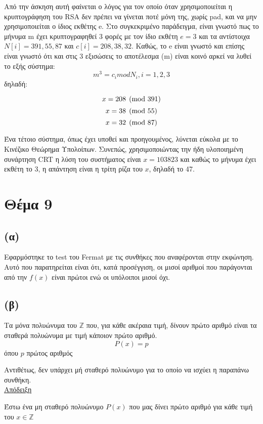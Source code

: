 \documentclass[a4paper, 11pt]{article}
\newcommand{\lt}{\latintext}
\begin{document}
Από την άσκηση αυτή φαίνεται ο λόγος για τον οποίο όταν χρησιμοποιείται η κρυπτογράφηση του {\lt RSA} δεν πρέπει να γίνεται ποτέ μόνη της, χωρίς {\lt pad}, και να μην χρησιμοποιείται ο ίδιος εκθέτης {\lt e}. Στο συγκεκριμένο παράδειγμα, είναι γνωστό πως το μήνυμα {\lt m} έχει κρυπτογραφηθεί 3 φορές με τον ίδιο εκθέτη $ e = 3 $ και τα αντίστοιχα $ N[i] = 391, 55, 87 $ και $ c[i] = 208, 38, 32 $. Καθώς, το {\lt e} είναι γνωστό και επίσης είναι γνωστό ότι και στις 3 εξισώσεις το αποτέλεσμα ({\lt m}) είναι κοινό αρκεί να λυθεί το εξής σύστημα:
\[ m^3 = c_i mod N_i , i = 1,2,3 \]
δηλαδή:

\[ x = 208 \pmod{391} \\ \]
\[ x = 38 \pmod{55}  \\ \]
\[ x = 32 \pmod{87}  \\ \]

Ένα τέτοιο σύστημα, όπως έχει υποθεί και προηγουμένος, λύνεται εύκολα με το Κινέζικο Θεώρημα Υπολοίπων. Συνεπώς, χρησιμοποιώντας την ήδη υλοποιημένη συνάρτηση {\lt CRT} η λύση του συστήματος είναι $ x = 103823 $ και καθώς το μήνυμα έχει εκθέτη το 3, η απάντηση είναι η τρίτη ρίζα του $x$, δηλαδή το 47.


\newpage


\section*{Θέμα 9}
\subsection*{(α)} Εφαρμόστηκε το test του {\lt Fermat} με τις συνθήκες που αναφέρονται στην εκφώνηση. Αυτό που παρατηρείται είναι ότι, κατά προσέγγιση, οι μισοί αριθμοί που παράγονται από την $f(x)$ είναι πρώτοι ενώ οι υπόλοιποι μισοί όχι.
\subsection*{(β)} Τα μόνα πολυώνυμα του $\mathbb{Z}$ που, για κάθε ακέραια τιμή, δίνουν πρώτο αριθμό είναι τα σταθερά πολυώνυμα με τιμή κάποιον πρώτο αριθμό.
\[P(x) = p\] όπου {\lt $p$} πρώτος αριθμός

Αντιθέτως, δεν υπάρχει μή σταθερό πολυώνυμο για το οποίο να ισχύει η παραπάνω συνθήκη.\\

\underline{Απόδειξη}

Έστω ένα μη σταθερό πολυώνυμο $P(x)$ που μας δίνει πρώτο αριθμό για κάθε τιμή του $x \in \mathbb{Z}$
\end{document}
